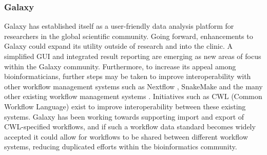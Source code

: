 \subsubsection{Galaxy}
Galaxy has established itself as a user-friendly data analysis platform for researchers in the global scientific community. Going forward, enhancements to Galaxy could expand its utility outside of research and into the clinic. A simplified GUI and integrated result reporting are emerging as new areas of focus within the Galaxy community.
Furthermore, to increase its appeal among bioinformaticians, further steps may be taken to improve interoperability with other workflow management systems such as Nextflow \cite{di2017nextflow}, SnakeMake \cite{koster2012snakemake} and the many other existing workflow management systems \cite{workflow-engines}.
Initiatives such as CWL (Common Workflow Language) \cite{amstutz2016common} exist to improve interoperability between these existing systems. Galaxy has been working towards supporting import and export of CWL-specified workflows, and if such a workflow data standard becomes widely accepted it could allow for workflows to be shared between different workflow systems, reducing duplicated efforts within the bioinformatics community.

